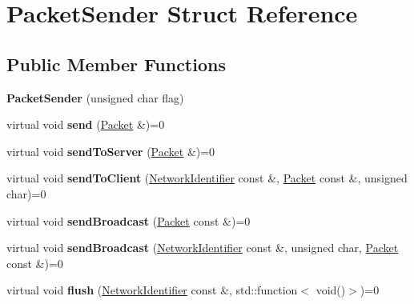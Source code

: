 \hypertarget{struct_packet_sender}{}\section{Packet\+Sender Struct Reference}
\label{struct_packet_sender}
\subsection*{Public Member Functions}
\begin{DoxyCompactItemize}
\item 
\mbox{\label{struct_packet_sender_ad6ca40dd4da95aa01844bc3a61ae1779}} 
{\bfseries Packet\+Sender} (unsigned char flag)
\item 
\mbox{\label{struct_packet_sender_a383d3d64ee8825d0bb301d791f30f48a}} 
virtual void {\bfseries send} (\mbox{\hyperlink{struct_packet}{Packet}} \&)=0
\item 
\mbox{\label{struct_packet_sender_a584fce12fb8689f524ff97cba3e316ea}} 
virtual void {\bfseries send\+To\+Server} (\mbox{\hyperlink{struct_packet}{Packet}} \&)=0
\item 
\mbox{\label{struct_packet_sender_ac51b9256f92fd65989da9edd27a806e6}} 
virtual void {\bfseries send\+To\+Client} (\mbox{\hyperlink{struct_network_identifier}{Network\+Identifier}} const \&, \mbox{\hyperlink{struct_packet}{Packet}} const \&, unsigned char)=0
\item 
\mbox{\label{struct_packet_sender_ac662cdcaecc98b772072134db98b0088}} 
virtual void {\bfseries send\+Broadcast} (\mbox{\hyperlink{struct_packet}{Packet}} const \&)=0
\item 
\mbox{\label{struct_packet_sender_afa69667ae7a639571ddd805ff16f1be5}} 
virtual void {\bfseries send\+Broadcast} (\mbox{\hyperlink{struct_network_identifier}{Network\+Identifier}} const \&, unsigned char, \mbox{\hyperlink{struct_packet}{Packet}} const \&)=0
\item 
\mbox{\label{struct_packet_sender_ab2b136958ad32901dcd767594db7d597}} 
virtual void {\bfseries flush} (\mbox{\hyperlink{struct_network_identifier}{Network\+Identifier}} const \&, std\+::function$<$ void()$>$)=0
\end{DoxyCompactItemize}
